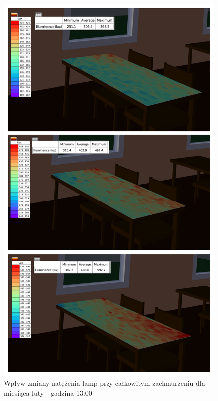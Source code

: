 \documentclass[a4paper,12pt]{article}
\begin{document}
	\begin{figure}[!ht]
		\includegraphics[scale=0.8]{wplyw_natezenia}
		\centering
		\caption{Wpływ zmiany natężenia lamp przy całkowitym zachmurzeniu dla miesiąca luty - godzina 13:00}
		\label{fig:wplyw_natezenia_symulacja}
	\end{figure}
\end{document}
